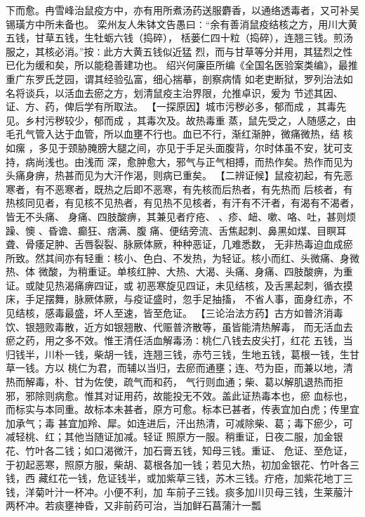 \documentclass[a4paper,12pt,UTF8,twoside]{ctexbook}
\begin{document}
下而愈。冉雪峰治鼠疫方中，亦有用所煮汤药送服麝香，以通络透毒者，又可补吴锡璜方中所未备也。 
栾州友人朱钵文告愚曰∶“余有善消鼠疫结核之方，用川大黄五钱，甘草五钱，生牡蛎六钱（捣碎）， 
栝蒌仁四十粒（捣碎），连翘三钱。煎汤服之，其核必消。”按∶此方大黄五钱似近猛 
烈，而与甘草等分并用，其猛烈之性已化为缓和矣，所以能稳善建功也。 
绍兴何廉臣所编《全国名医验案类编》，最推重广东罗氏芝园，谓其经验弘富，细心揣摹，剖察病情 
如老吏断狱，罗列治法如名将谈兵，以活血去瘀之方，划清鼠疫主治界限，允推卓识，爰为 
节述其因、证、方、药，俾后学有所取法。 
【一探原因】城市污秽必多，郁而成 ，其毒先见。乡村污秽较少，郁而成 ，其毒次及。故热毒重 
蒸，鼠先受之，人随感之，由毛孔气管入达于血管，所以血壅不行也。血已不行，渐红渐肿，微痛微热，结 
核如瘰 ，多见于颈胁腌膀大腿之间，亦见于手足头面腹背，尔时体虽不安，犹可支持，病尚浅也。由浅而 
深，愈肿愈大，邪气与正气相搏，而热作矣。热作而见为头痛身痹，热甚而见为大汗作渴，则病已重矣。 
【二辨证候】鼠疫初起，有先恶寒者，有不恶寒者，既热之后即不恶寒，有先核而后热者，有先热而 
后核者，有热核同见者，有见核不见热者，有见热不见核者，有汗有不汗者，有渴有不渴者，皆无不头痛、 
身痛、四肢酸痹，其兼见者疗疮、 、疹、衄、嗽、咯、吐，甚则烦躁、懊 、昏谵、癫狂、痞满、腹 
痛、便结旁流、舌焦起刺、鼻黑如煤、目瞑耳聋、骨痿足肿、舌唇裂裂、脉厥体厥，种种恶证，几难悉数， 
无非热毒迫血成瘀所致。然其间亦有轻重∶核小、色白、不发热，为轻证。核小而红、头微痛、身微热、体 
微酸，为稍重证。单核红肿、大热、大渴、头痛、身痛、四肢酸痹，为重证。或陡见热渴痛痹四证，或 
初恶寒旋见四证，未见结核，及舌黑起刺，循衣摸床，手足摆舞，脉厥体厥，与疫证盛时，忽手足抽搐， 
不省人事，面身红赤，不见结核，感毒最盛，坏人至速，皆至危证。 
【三论治法方药】古方如普济消毒饮、银翘败毒散，近方如银翘散、代赈普济散等，虽皆能清热解毒， 
而无活血去瘀之药，用之多不效。惟王清任活血解毒汤∶桃仁八钱去皮尖打，红花 
五钱，当归钱半，川朴一钱，柴胡一钱，连翘三钱，赤芍三钱，生地五钱，葛根一钱，生甘草一钱。方以 
桃仁为君，而辅以当归，去瘀而通壅；连、芍为臣，而兼以地，清热而解毒，朴、甘为佐使，疏气而和药， 
气行则血通；柴、葛以解肌退热而拒邪，邪除则病愈。惟其对证用药，故能投无不效。盖此证热毒本也，瘀 
血标也，而标实与本同重。故标本未甚者，原方可愈。标本已甚者，传表宜加白虎；传里宜加承气；毒 
甚宜加羚、犀。如连进后，汗出热清，可减除柴、葛；毒下瘀少，可减轻桃、红；其他当随证加减。轻证 
照原方一服。稍重证，日夜二服，加金银花、竹叶各二钱；如口渴微汗，加石膏五钱，知母三钱。重证、 
危证、至危证，于初起恶寒，照原方服，柴胡、葛根各加一钱；若见大热，初加金银花、竹叶各三钱，西 
藏红花一钱，危证钱半，或加紫草三钱，苏木三钱。疔疮，加紫花地丁三钱，洋菊叶汁一杯冲。小便不利，加 
车前子三钱。痰多加川贝母三钱，生莱菔汁两杯冲。若痰壅神昏，又非前药可治，当加鲜石菖蒲汁一瓢 
\end{document}
